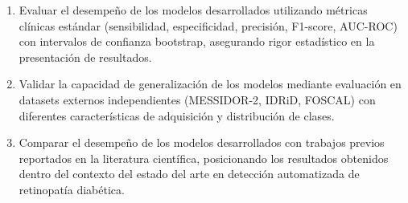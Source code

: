 \begin{enumerate}[label=\textbf{OE\arabic*.}, leftmargin=*, itemsep=0.5em]
    \item Evaluar el desempeño de los modelos desarrollados utilizando métricas clínicas estándar (sensibilidad, especificidad, precisión, F1-score, AUC-ROC) con intervalos de confianza bootstrap, asegurando rigor estadístico en la presentación de resultados.

    \item Validar la capacidad de generalización de los modelos mediante evaluación en datasets externos independientes (MESSIDOR-2, IDRiD, FOSCAL) con diferentes características de adquisición y distribución de clases.

    \item Comparar el desempeño de los modelos desarrollados con trabajos previos reportados en la literatura científica, posicionando los resultados obtenidos dentro del contexto del estado del arte en detección automatizada de retinopatía diabética.

\end{enumerate}

